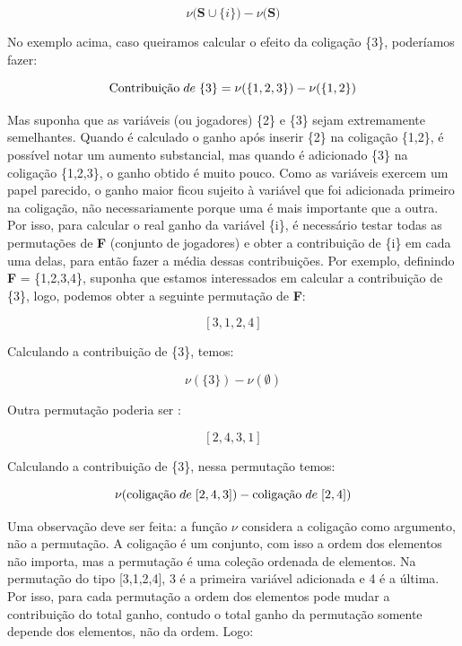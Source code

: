 \[
\nu({\textbf{S} \cup \{i\})} - \nu({\textbf{S})}  
\]

No exemplo acima, caso queiramos calcular o efeito da coligação \{3\}, poderíamos fazer:

\[
\text{Contribuição} \hspace{1mm} de \hspace{1mm} \{3\} = \nu(\{1,2,3\}) - \nu(\{1,2\})  
\]

Mas suponha que as variáveis (ou jogadores) \{2\} e \{3\} sejam extremamente semelhantes. Quando é calculado o ganho após inserir \{2\} na coligação \{1,2\}, é possível notar um aumento substancial, mas quando é adicionado \{3\} na coligação \{1,2,3\}, o ganho obtido é muito pouco. Como as variáveis exercem um papel parecido, o ganho maior ficou sujeito à variável que foi adicionada primeiro na coligação, não necessariamente porque uma é mais importante que a outra. 
Por isso, para calcular o real ganho da variável \{i\}, é necessário testar todas as permutações de \textbf{F} (conjunto de jogadores) e obter a contribuição de \{i\} em cada uma delas, para então fazer a média dessas contribuições. Por exemplo, definindo \textbf{F} = \{1,2,3,4\}, suponha que estamos interessados em calcular a contribuição de \{3\}, logo, podemos obter a seguinte permutação de  \textbf{F}:

$$[3,1,2,4]$$

Calculando a contribuição de \{3\}, temos: 

$$\nu(\{3\}) - \nu(\emptyset) $$

Outra permutação poderia ser :

$$[2,4,3,1]$$

Calculando a contribuição de \{3\}, nessa permutação temos: 

$$\nu(\text{coligação} \hspace{1mm} de \hspace{1mm} [2,4,3]) - \text{coligação} \hspace{1mm} de \hspace{1mm} [2,4]) $$

Uma observação deve ser feita: a função $\nu$ considera a coligação como argumento, não a permutação. A coligação é um conjunto, com isso a ordem dos elementos não importa, mas a permutação é uma coleção ordenada de elementos. Na permutação do tipo [3,1,2,4], 3 é a primeira variável adicionada e 4 é a última. Por isso, para cada permutação a ordem dos elementos pode mudar a contribuição do total ganho, contudo o total ganho da permutação somente depende dos elementos, não da ordem. Logo:

